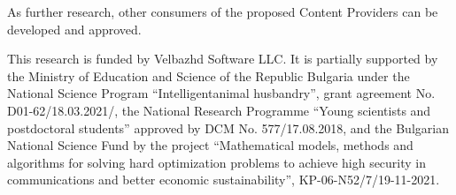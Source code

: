 \documentclass{ifacconf}
\begin{document}
As further research, other consumers of the proposed Content Providers can be developed and approved.

\begin{ack}
This research is funded by Velbazhd Software LLC. It is partially supported by the Ministry of Education and Science of the Republic Bulgaria under the National Science Program “Intelligentanimal husbandry”, grant agreement No. D01-62/18.03.2021/, the National Research Programme “Young scientists and postdoctoral students” approved by DCM No. 577/17.08.2018, and the Bulgarian National Science Fund by the project “Mathematical models, methods and algorithms for solving hard optimization problems to achieve high security in communications and better economic sustainability”, KP-06-N52/7/19-11-2021.
\end{ack}


\end{document}

